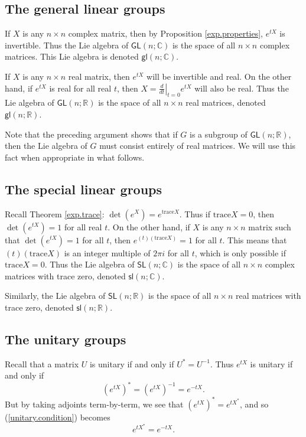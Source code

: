 \documentclass{amsbook}
\theoremstyle{plain}
\numberwithin{equation}{chapter}
\numberwithin{theorem}{chapter}
\begin{document}
\subsection{The general linear groups}

If $X$ is any $n\times n$ complex matrix, then by Proposition
\ref{exp.properties}, $e^{tX}$ is invertible. Thus the Lie algebra of
$\mathsf{GL}(n;\mathbb{C})$ is the space of all $n\times n$ complex matrices.
This Lie algebra is denoted $\mathsf{gl}(n;\mathbb{C})$.

If $X$ is any $n\times n$ real matrix, then $e^{tX}$ will be invertible and
real. On the other hand, if $e^{tX}$ is real for all real $t$, then $X=\left.
\tfrac{d}{dt}\right|  _{t=0}e^{tX}$ will also be real. Thus the Lie algebra of
$\mathsf{GL}(n;\mathbb{R})$ is the space of all $n\times n$ real matrices,
denoted $\mathsf{gl}(n;\mathbb{R})$.

Note that the preceding argument shows that if $G$ is a subgroup of
$\mathsf{GL}(n;\mathbb{R})$, then the Lie algebra of $G$ must consist entirely
of real matrices. We will use this fact when appropriate in what follows.

\subsection{The special linear groups}

Recall Theorem \ref{exp.trace}: $\det\left(  e^{X}\right)  =e^{\mathrm{trace}%
X}$. Thus if $\mathrm{trace}X=0$, then $\det\left(  e^{tX}\right)  =1$ for all
real $t$. On the other hand, if $X$ is any $n\times n$ matrix such that
$\det\left(  e^{tX}\right)  =1$ for all $t$, then $e^{(t)(\mathrm{trace}X)}=1$
for all $t$. This means that $(t)(\mathrm{trace}X)$ is an integer multiple of
$2\pi i$ for all $t$, which is only possible if $\mathrm{trace}X=0$. Thus the
Lie algebra of $\mathsf{SL}\left(  n;\mathbb{C}\right)  $ is the space of all
$n\times n$ complex matrices with trace zero, denoted $\mathsf{sl}%
(n;\mathbb{C}) $.

Similarly, the Lie algebra of $\mathsf{SL}\left(  n;\mathbb{R}\right)  $ is
the space of all $n\times n$ real matrices with trace zero, denoted
$\mathsf{sl}\left(  n;\mathbb{R}\right)  $.

\subsection{The unitary groups}

Recall that a matrix $U$ is unitary if and only if $U^{*}=U^{-1}$. Thus
$e^{tX}$ is unitary if and only if
\begin{equation}
\left(  e^{tX}\right)  ^{*}=\left(  e^{tX}\right)  ^{-1}=e^{-tX}%
\text{.}\label{unitary.condition}%
\end{equation}
But by taking adjoints term-by-term, we see that $\left(  e^{tX}\right)
^{*}=e^{tX^{*}}$, and so (\ref{unitary.condition}) becomes
\begin{equation}
e^{tX^{*}}=e^{-tX}\text{.}\label{skew}%
\end{equation}
\end{document}
